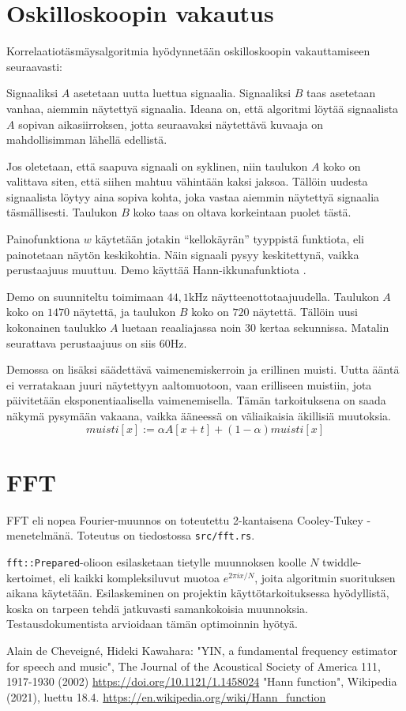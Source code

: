 \documentclass[11pt,oneside,a4paper]{memoir}
\begin{document}
\section*{Oskilloskoopin vakautus}

Korrelaatiotäsmäysalgoritmia hyödynnetään oskilloskoopin vakauttamiseen seuraavasti:

Signaaliksi $A$ asetetaan uutta luettua signaalia. Signaaliksi $B$ taas asetetaan vanhaa,
aiemmin näytettyä signaalia. Ideana on, että algoritmi löytää signaalista $A$ sopivan aikasiirroksen,
jotta seuraavaksi näytettävä kuvaaja on mahdollisimman lähellä edellistä.

Jos oletetaan, että saapuva signaali on syklinen, niin taulukon $A$ koko on valittava
siten, että siihen mahtuu vähintään kaksi jaksoa. Tällöin uudesta signaalista löytyy aina sopiva kohta,
joka vastaa aiemmin näytettyä signaalia täsmällisesti. Taulukon $B$ koko taas on oltava
korkeintaan puolet tästä.

Painofunktiona $w$ käytetään jotakin ``kellokäyrän'' tyyppistä funktiota, eli painotetaan
näytön keskikohtia. Näin signaali pysyy keskitettynä, vaikka perustaajuus muuttuu. Demo
käyttää Hann-ikkunafunktiota \cite{hann}.

Demo on suunniteltu toimimaan $44{,}1 \si{\kilo\hertz}$ näytteenottotaajuudella. Taulukon $A$ koko
on $1470$ näytettä, ja taulukon $B$ koko on $720$ näytettä. Tällöin uusi kokonainen taulukko
$A$ luetaan reaaliajassa noin 30 kertaa sekunnissa. Matalin seurattava perustaajuus on siis
$60 \si\hertz$.

Demossa on lisäksi säädettävä vaimenemiskerroin ja erillinen muisti. Uutta ääntä ei verratakaan
juuri näytettyyn aaltomuotoon, vaan erilliseen muistiin, jota päivitetään eksponentiaalisella
vaimenemisella. Tämän tarkoituksena on saada näkymä pysymään vakaana, vaikka ääneessä
on väliaikaisia äkillisiä muutoksia.
\[
\mathit{muisti}[x] := \alpha A[x+t] + (1-\alpha) \mathit{muisti}[x]
\]

\section*{FFT}

FFT eli nopea Fourier-muunnos on toteutettu 2-kantaisena Cooley-Tukey -menetelmänä.
Toteutus on tiedostossa \texttt{src/fft.rs}.

\texttt{fft::Prepared}-olioon esilasketaan tietylle muunnoksen koolle $N$
twiddle-kertoimet, eli kaikki kompleksiluvut muotoa $e^{2\pi i x / N}$, joita algoritmin
suorituksen aikana käytetään. Esilaskeminen on projektin käyttötarkoituksessa
hyödyllistä, koska on tarpeen tehdä jatkuvasti samankokoisia muunnoksia.
Testausdokumentista arvioidaan tämän optimoinnin hyötyä.


\begin{thebibliography}{1}
 Alain de Cheveigné, Hideki Kawahara: "YIN, a fundamental frequency estimator for speech and music", The Journal of the Acoustical Society of America 111, 1917-1930 (2002) \url{https://doi.org/10.1121/1.1458024}
 "Hann function", Wikipedia (2021), luettu 18.4. \url{https://en.wikipedia.org/wiki/Hann_function}
\end{thebibliography}
\end{document}
